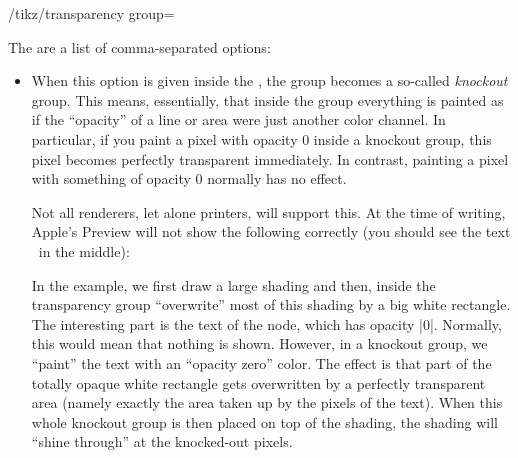 \begin{key}{/tikz/transparency group=}
\begin{codeexample}[preamble={\usetikzlibrary{patterns,shapes.symbols}}]
\end{codeexample}

    The  are a list of comma-separated options:
    \begin{itemize}
        \item {} When this option is given inside the
            , the group becomes a so-called \emph{knockout}
            group. This means, essentially, that inside the group everything is
            painted as if the ``opacity'' of a line or area were just another
            color channel. In particular, if you paint a pixel with opacity $0$
            inside a knockout group, this pixel becomes perfectly transparent
            immediately. In contrast, painting a pixel with something of
            opacity $0$ normally has no effect.

            Not all renderers, let alone printers, will support this. At the
            time of writing, Apple's Preview will not show the following
            correctly (you should see the text \tikzname\ in the middle):
\begin{codeexample}[]
\end{codeexample}
            In the example, we first draw a large shading and then, inside the
            transparency group ``overwrite'' most of this shading by a big
            white rectangle. The interesting part is the text of the node,
            which has opacity |0|. Normally, this would mean that nothing is
            shown. However, in a knockout group, we ``paint'' the text with an
            ``opacity zero'' color. The effect is that part of the totally
            opaque white rectangle gets overwritten by a perfectly transparent
            area (namely exactly the area taken up by the pixels of the text).
            When this whole knockout group is then placed on top of the
            shading, the shading will ``shine through'' at the knocked-out
            pixels.


\end{itemize}
\end{key}

